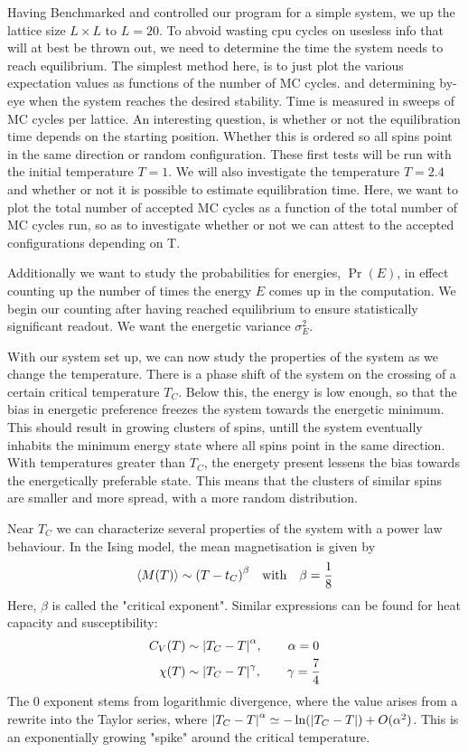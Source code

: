 \documentclass[10pt, twocolumn]{revtex4-1}
\begin{document}
Having Benchmarked and controlled our program for a simple system, we up the lattice size $L\times L$ to $L=20$. To abvoid wasting cpu cycles on usesless
info that will at best be thrown out, we need to determine the time the system needs to reach equilibrium. The simplest method here, is to just plot the
various expectation values as functions of the number of MC cycles. and determining by-eye when the system reaches the desired stability. Time is measured in
sweeps of MC cycles per lattice. An interesting question, is whether or not the equilibration time depends on the starting position. Whether this is
ordered so all spins point in the same direction or random configuration. These first tests will be run with the initial temperature $T=1$. We will also
investigate the temperature $T = 2.4$ and whether or not it is possible to estimate equilibration time. Here, we want to plot the total number of accepted
MC cycles as a function of the total number of MC cycles run, so as to investigate whether or not we can attest to the accepted configurations depending
on T.

Additionally we want to study the probabilities for energies, $\Pr(E)$, in effect counting up the number of times the energy $E$ comes up in the computation.
We begin our counting after having reached equilibrium to ensure statistically significant readout. We want the energetic variance $\sigma_E^2$.

With our system set up, we can now study the properties of the system as we change the temperature. There is a phase shift of the system on the crossing of
a certain critical temperature $T_C$. Below this, the energy is low enough, so that the bias in energetic preference freezes the system towards the energetic
minimum. This should result in growing clusters of spins, untill the system eventually inhabits the minimum energy state where all spins point in the same
direction. With temperatures greater than $T_C$, the energety present lessens the bias towards the energetically preferable state. This means that the clusters
of similar spins are smaller and more spread, with a more random distribution.

Near $T_C$ we can characterize several properties of the system with a power law behaviour. In the Ising model, the mean magnetisation is given by
\[ \ev{M(T)} \sim \qty( T - t_C )^{\beta} \qq{with} \beta = \frac{1}{8} \]
Here, $\beta$ is called the "critical exponent". %
Similar expressions can be found for heat capacity and susceptibility:
\begin{align*}
    C_V(T) &\sim \qty| T_C - T |^{\alpha}, \qq{} \alpha = 0 \\
    \chi(T) &\sim \qty| T_C - T |^{\gamma}, \qq{} \gamma = \frac{7}{4}
\end{align*}
The 0 exponent stems from logarithmic divergence, where the value
arises from a rewrite into the Taylor series, where $\qty| T_C - T |^{\alpha} \simeq -\ln(\qty| T_C - T | ) + O(\alpha^2)$. This is an exponentially growing
"spike" around the critical temperature.
\end{document}
